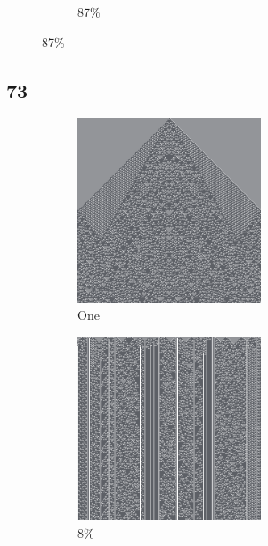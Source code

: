 \documentclass[12pt, fleqn]{report}                             %
\theoremstyle{break}                                            %
\begin{document}
\begin{figure}[ht!]
\begin{subfigure}[b]{0.4\linewidth}
          \caption{87\%}
        \end{subfigure}
      \end{figure}


      \subsection{73}
      \begin{figure}[ht!]
        \centering
        \begin{subfigure}[b]{0.4\linewidth}
          \includegraphics[width=0.6\textwidth]{Images/73/a.png}
          \caption{One}
        \end{subfigure}
        \begin{subfigure}[b]{0.4\linewidth}
          \includegraphics[width=0.6\textwidth]{Images/73/b.png}
          \caption{8\%}
        \end{subfigure}
        \begin{subfigure}[b]{0.4\linewidth}

\end{subfigure}
\end{figure}
\end{document}
